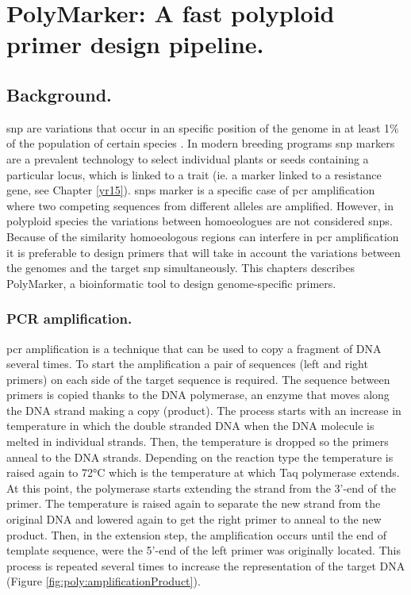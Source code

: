 
\chapter{PolyMarker: A fast polyploid primer design pipeline.}
\glsresetall
\label{cha:polymarker}
\section{Background.}


\gls{snp} are variations that occur in an specific position of the genome in at least 1\% of the population of certain species \citep{Jehan2006}. 
In modern breeding programs \gls{snp} markers are a prevalent technology to select individual plants or seeds containing a particular locus, which is linked to a trait (ie. a marker linked to a resistance gene, see Chapter \ref{yr15}). 
\glspl{snp} marker is a specific case of \gls{pcr} amplification where two competing sequences from different alleles are amplified. 
However, in polyploid species the variations between homoeologues are not considered \glspl{snp}.
Because of the similarity homoeologous regions can interfere in \gls{pcr} amplification it is preferable to design primers that will take in account the variations between the genomes and the target \gls{snp} simultaneously. 
This chapters describes PolyMarker, a bioinformatic tool to design genome-specific primers. 

\subsection{PCR amplification.}
\Gls{pcr} amplification is a technique that can be used to copy a fragment of DNA several times. 
To start the amplification a pair of sequences (left and right primers) on each side of the target sequence is required. 
The sequence between primers is copied thanks to the DNA polymerase, an enzyme that moves along the DNA strand making a copy (product). 
The process starts with an increase in temperature in which the double stranded DNA when the DNA molecule is melted in individual strands. 
Then, the temperature is dropped so the primers anneal to the DNA strands. 
Depending on the reaction type the temperature is raised again to 72°C which is the temperature at which Taq polymerase extends. 
At this point, the polymerase starts extending the strand from the 3'-end of the primer. 
The temperature is raised again to separate the new strand from the original DNA and lowered again to get the right primer to anneal to the new product.
Then, in the extension step, the amplification occurs until the end of template sequence, were the 5'-end of the left primer was originally located. 
This process is repeated several times to increase the representation of the target DNA (Figure \ref{fig:poly:amplificationProduct}).  

